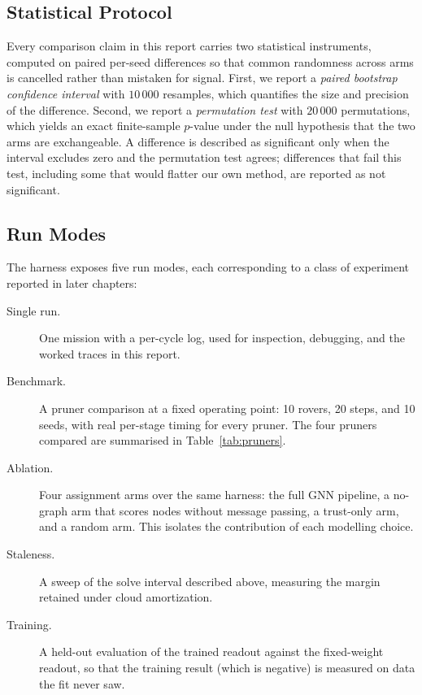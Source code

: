 \subsection{Statistical Protocol}
\label{sec:sim-stats}

Every comparison claim in this report carries two statistical
instruments, computed on paired per-seed differences so that common
randomness across arms is cancelled rather than mistaken for signal.
First, we report a \emph{paired bootstrap confidence interval} with
$10\,000$ resamples, which quantifies the size and precision of the
difference. Second, we report a \emph{permutation test} with $20\,000$
permutations, which yields an exact finite-sample $p$-value under the
null hypothesis that the two arms are exchangeable. A difference is
described as significant only when the interval excludes zero and the
permutation test agrees; differences that fail this test, including some
that would flatter our own method, are reported as not significant.

\subsection{Run Modes}

The harness exposes five run modes, each corresponding to a class of
experiment reported in later chapters:

\begin{description}
  \item[Single run.] One mission with a per-cycle log, used for
    inspection, debugging, and the worked traces in this report.
  \item[Benchmark.] A pruner comparison at a fixed operating point: 10
    rovers, 20 steps, and 10 seeds, with real per-stage timing for every
    pruner. The four pruners compared are summarised in
    Table~\ref{tab:pruners}.
  \item[Ablation.] Four assignment arms over the same harness: the full
    GNN pipeline, a no-graph arm that scores nodes without message
    passing, a trust-only arm, and a random arm. This isolates the
    contribution of each modelling choice.
  \item[Staleness.] A sweep of the solve interval described above,
    measuring the margin retained under cloud amortization.
  \item[Training.] A held-out evaluation of the trained readout against
    the fixed-weight readout, so that the training result (which is
    negative) is measured on data the fit never saw.
\end{description}

